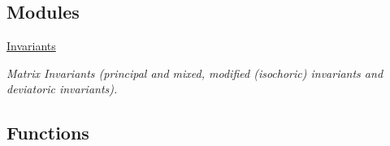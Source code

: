 \subsection*{\-Modules}
\begin{DoxyCompactItemize}
\item 
\hyperlink{group__InvariantGroup}{\-Invariants}
\begin{DoxyCompactList}\small\item\em \-Matrix \-Invariants (principal and mixed, modified (isochoric) invariants and deviatoric invariants). \end{DoxyCompactList}\end{DoxyCompactItemize}
\subsection*{\-Functions}
